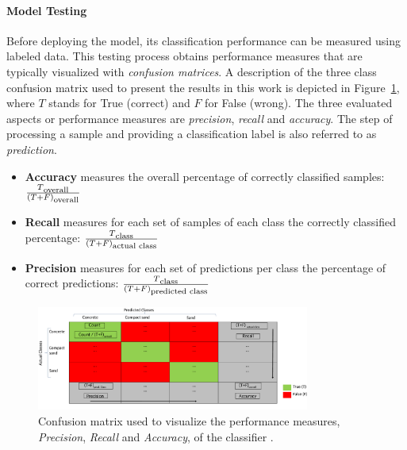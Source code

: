 \paragraph*{Model Testing}
Before deploying the model, its classification performance can be measured using labeled data.
This testing process obtains performance measures that are typically visualized with \emph{confusion matrices}. 
A description of the three class confusion matrix used to present the results in this work is depicted in Figure~\ref{fig:CMdescrpit}, where $T$ stands for True (correct) and $F$ for False (wrong).
The three evaluated aspects or performance measures are \emph{precision}, \emph{recall} and \emph{accuracy}.
The step of processing a sample and providing a classification label is also referred to as \emph{prediction}.

\begin{itemize}
\item \textbf{Accuracy} measures the overall percentage of correctly classified samples: $\frac{T\textsubscript{overall}}{(T+F)\textsubscript{overall}}$ 
\item \textbf{Recall} measures for each set of samples of each class the correctly classified percentage: $\frac{T\textsubscript{class}}{(T+F)\textsubscript{actual class}}$%
\item \textbf{Precision} measures for each set of predictions per class the percentage of correct predictions: $\frac{T\textsubscript{class}}{(T+F)\textsubscript{predicted class}}$%
\end{itemize}


\begin{figure}[!htbp]
    \centering
    \includegraphics[width=0.8\textwidth]{../figures/CM_Description.pdf}
    \caption{\label{fig:CMdescrpit} Confusion matrix used to visualize the performance measures, \emph{Precision}, \emph{Recall} and \emph{Accuracy}, of the classifier \citep{kuhr2021}.}
\end{figure}


